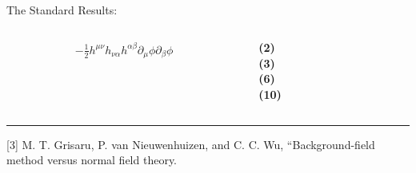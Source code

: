 \documentclass[aspectratio=169,usenames,dvipsnames]{beamer}
\begin{document}
\begin{frame}[t]{\centering {}\\ The Standard Results:}
{\begin{columns}
\begin{column}{0.85\textwidth}
\begin{alignat*}{3}
  - \frac{1}{2} h^{\mu \nu} h_{\nu \alpha} h^{\alpha \beta} \partial_{\mu} \phi
  \partial_{\beta} \phi
\end{alignat*}
  \end{column}
  \begin{column}{0.1\textwidth}
    \hfill {\bf{\textcolor{LUCopper}{\normalsize{(2)}}}} \\[5mm]
    \hfill {\bf{\textcolor{LUCopper}{\normalsize{(3)}}}} \\[10mm]
    \hfill {\bf{\textcolor{LUCopper}{\normalsize{(6)}}}} \\[17mm]
    \hfill {\bf\textcolor{LUCopper}{\normalsize{(10)}}}
    \vspace{17mm}
  \end{column}
\end{columns}
\vspace{2mm}
{\textcolor{LUCopper}{\rule{\textwidth}{1pt}}}
{\tiny  [3] M. T. Grisaru, P. van Nieuwenhuizen, and C. C. Wu, “Background-field method versus normal field theory.}}


\end{frame}
\end{document}
